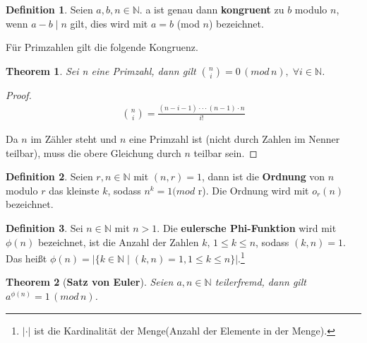 \documentclass[12pt,oneside]{article}
\newtheorem{theorem}{Theorem}[section]
\theoremstyle{remark}
\theoremstyle{definition}
\newtheorem{definition}{Definition}[section]
\begin{document}
\begin{definition}\label{Df_3}
Seien $a, b, n \in \mathbb{N}$. a ist genau dann \textbf{kongruent} zu $b$ modulo $n$, wenn $a - b \mid n$ gilt, dies wird mit $a = b$ (mod $n$) bezeichnet.  
\end{definition}

Für Primzahlen gilt die folgende Kongruenz.

\begin{theorem}\label{th_25}
Sei n eine Primzahl, dann gilt ${n \choose i} = 0 \, ( mod \, n), \; \forall i \in \mathbb{N}$.
\end{theorem}

\begin{proof}
\begin{align*}\label{modb}
    {n \choose i} = \frac{(n - i - 1) \cdot  \cdot  \cdot (n - 1) \cdot n }{i!}
\end{align*}

Da $n$ im Zähler steht und $n$ eine Primzahl ist (nicht durch Zahlen im Nenner teilbar), muss die obere Gleichung  durch $n$ teilbar sein. 
\end{proof}

\smallskip

\begin{definition}\label{Df_4}
Seien $r,n \in \mathbb{N}$ mit $(n,r) = 1$, dann ist die \textbf{Ordnung} von $n$ modulo $r$ das kleinste $k$, sodass $n^k = 1 (mod $ r). Die Ordnung wird mit $o_{r}(n)$ bezeichnet.
\end{definition}

\smallskip 

   
\begin{definition}\label{Df_6}
Sei $n \in \mathbb{N}$ mit $n > 1$. Die \textbf{eulersche Phi-Funktion} wird mit $\phi(n)$ bezeichnet, ist die Anzahl der Zahlen $k, \, 1 \leq k \leq n$, sodass $(k,n) = 1$. Das heißt $\phi(n) = |\{ k \in \mathbb{N} \mid (k,n) = 1, 1 \leq k \leq n \}|$.\footnote{$| \cdot |$ ist die Kardinalität der Menge(Anzahl der Elemente in der Menge).}
\end{definition}

\smallskip

\begin{theorem}[\textbf{Satz von Euler}]\label{Th_1}
Seien $a,n \in \mathbb{N}$ teilerfremd, \newline dann gilt $a^{\phi(n)} = 1 \, (mod \, n) $.
\end{theorem}
\end{document}
